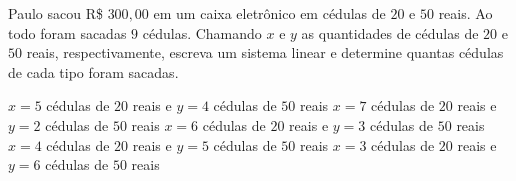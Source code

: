 Paulo sacou R\$ $300{,}00$ em um caixa eletrônico em cédulas de $20$ e $50$ reais. Ao todo foram sacadas $9$ cédulas. Chamando $x$ e $y$ as quantidades de cédulas de $20$ e $50$ reais, respectivamente, escreva um sistema linear e determine quantas cédulas de cada tipo foram sacadas.

$x=5$ cédulas de $20$ reais e $y=4$ cédulas de $50$ reais
$x=7$ cédulas de $20$ reais e $y=2$ cédulas de $50$ reais
$x=6$ cédulas de $20$ reais e $y=3$ cédulas de $50$ reais
$x=4$ cédulas de $20$ reais e $y=5$ cédulas de $50$ reais
$x=3$ cédulas de $20$ reais e $y=6$ cédulas de $50$ reais


